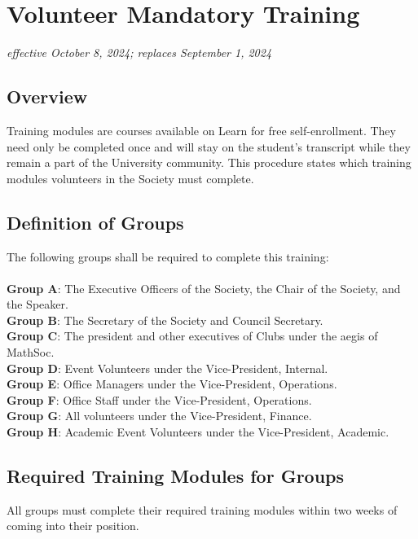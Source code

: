 \section{Volunteer Mandatory Training}
\emph{effective October 8, 2024; replaces September 1, 2024}\\

\subsection{Overview}

Training modules are courses available on Learn for free self-enrollment. They need only be
completed once and will stay on the student's transcript while they remain a part of the
University community. This procedure states which training modules volunteers in the
Society must complete.

\subsection{Definition of Groups}

The following groups shall be required to complete this training: \\
\\ \textbf{Group A}: The Executive Officers of the Society, the Chair of the Society, and the Speaker.
\\ \textbf{Group B}: The Secretary of the Society and Council Secretary.
\\ \textbf{Group C}: The president and other executives of Clubs under the aegis of MathSoc.
\\ \textbf{Group D}: Event Volunteers under the Vice-President, Internal.
\\ \textbf{Group E}: Office Managers under the Vice-President, Operations.
\\ \textbf{Group F}: Office Staff under the Vice-President, Operations.
\\ \textbf{Group G}: All volunteers under the Vice-President, Finance.
\\ \textbf{Group H}: Academic Event Volunteers under the Vice-President, Academic.

\subsection{Required Training Modules for Groups}

All groups must complete their required training modules within two weeks of coming into their
position.

